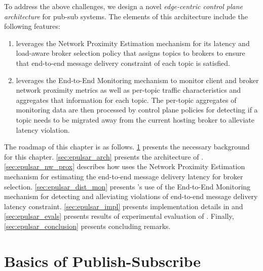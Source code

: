 \par To address the above challenges, we design a novel \textit{edge-centric control plane architecture} for pub-sub systems.  The elements of this architecture include the following features:
\begin{enumerate}
\item \epulsar leverages the Network Proximity Estimation mechanism for its latency and load-aware broker selection policy that assigns topics to brokers to ensure that end-to-end message delivery constraint of each topic is satisfied. 
\item \epulsar leverages the End-to-End Monitoring mechanism to monitor client and broker network proximity metrics as well as per-topic traffic characteristics and aggregates that information for each topic. The per-topic aggregates of monitoring data are then processed by control plane policies for detecting if a topic needs to be migrated away from the current hosting broker to alleviate latency violation.
\end{enumerate}
The roadmap of this chapter is as follows. \cref{sec:epulsar_background} presents the necessary background for this chapter. \cref{sec:epulsar_arch} presents the architecture of \epulsar{}. \cref{sec:epulsar_nw_prox} describes how \epulsar{} uses the Network Proximity Estimation mechanism for estimating the end-to-end message delivery latency for broker selection. \cref{sec:epulsar_dist_mon} presents \epulsar's use of the End-to-End Monitoring mechanism for detecting and alleviating violations of end-to-end message delivery latency constraint. \cref{sec:epulsar_impl} presents implementation details in \epulsar{} and \cref{sec:epulsar_evals} presents results of experimental evaluation of \epulsar{}. Finally, \cref{sec:epulsar_conclusion} presents concluding remarks.

\section{Basics of Publish-Subscribe}
\label{sec:epulsar_background}
